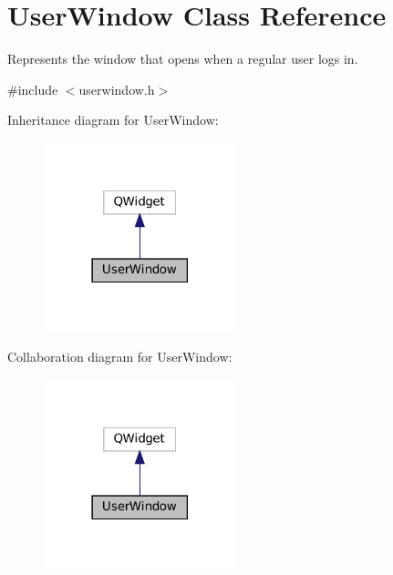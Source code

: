 \hypertarget{classUserWindow}{}\section{User\+Window Class Reference}
\label{classUserWindow}


Represents the window that opens when a regular user logs in.  




{\ttfamily \#include $<$userwindow.\+h$>$}



Inheritance diagram for User\+Window\+:
\nopagebreak
\begin{figure}[H]
\begin{center}
\leavevmode
\includegraphics[width=158pt]{classUserWindow__inherit__graph}
\end{center}
\end{figure}


Collaboration diagram for User\+Window\+:
\nopagebreak
\begin{figure}[H]
\begin{center}
\leavevmode
\includegraphics[width=158pt]{classUserWindow__coll__graph}
\end{center}
\end{figure}
